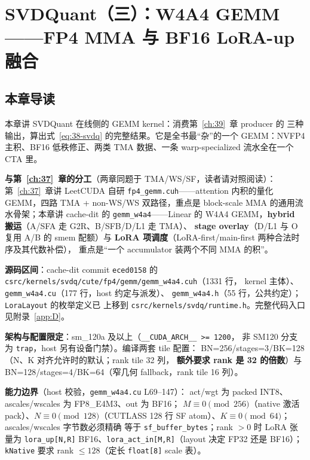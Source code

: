 \chapter{SVDQuant（三）：W4A4 GEMM——FP4 MMA 与 BF16 LoRA-up 融合}\label{ch:40}

\section{本章导读}

本章讲 SVDQuant 在线侧的 GEMM kernel：消费第~\ref{ch:39}~章 producer 的
三种输出，算出式~\ref{eq:38-svdq} 的完整结果。它是全书最“杂”的一个
GEMM：NVFP4 主积、BF16 低秩修正、两类 TMA 数据、一条 warp-specialized
流水全在一个 CTA 里。

\textbf{与第~\ref{ch:37}~章的分工}（两章同题于 TMA/WS/SF，读者请对照阅读）：
第~\ref{ch:37}~章讲 LeetCUDA 自研 \texttt{fp4\_gemm.cuh}——attention
内积的量化 GEMM，四路 TMA + non-WS/WS 双路径，重点是 block-scale MMA
的通用流水骨架；本章讲 cache-dit 的 \texttt{gemm\_w4a4}——Linear 的
W4A4 GEMM，\textbf{hybrid 搬运}（A/SFA 走 G2R、B/SFB/D/L1 走 TMA）、
\textbf{stage overlay}（D/L1 与 O 复用 A/B 的 smem 配额）与
\textbf{LoRA 项调度}（LoRA-first/main-first 两种合法时序及其代数补偿），
重点是“一个 accumulator 装两个不同 MMA 的积”。

\textbf{源码区间}：cache-dit commit \texttt{eced0158} 的
\texttt{csrc/kernels/svdq/cute/fp4/gemm/}\texttt{gemm\_w4a4.cuh}（1331 行，
kernel 主体）、\texttt{gemm\_w4a4.cu}（177 行，host 约定与派发）、
\texttt{gemm\_w4a4.h}（55 行，公共约定）；\texttt{LoraLayout} 的枚举定义已
上移到 \texttt{csrc/kernels/svdq/runtime.h}。完整代码入口见附录~\ref{app:D}。

\textbf{架构与配置限定}：sm\_120a 及以上（\texttt{\_\_CUDA\_ARCH\_\_ >= 1200}，
非 SM120 分支为 \texttt{trap}，host 另有设备门禁）。编译两套 tile 配置：
BN=256/stages=3/BK=128（N、K 对齐允许时的默认；rank tile 32 列，
\textbf{额外要求 rank 是 32 的倍数}）与 BN=128/stages=4/BK=64（窄几何
fallback，rank tile 16 列）。

\textbf{能力边界}（host 校验，\texttt{gemm\_w4a4.cu} L69--147）：
act/wgt 为 packed INT8、ascales/wscales 为 FP8\_E4M3、out 为 BF16；
$M\equiv0\pmod{256}$（native 激活 pack）、$N\equiv0\pmod{128}$（CUTLASS
128 行 SF atom）、$K\equiv0\pmod{64}$；ascales/wscales 字节数必须精确
等于 \texttt{sf\_buffer\_bytes}；rank $>0$ 时 LoRA 张量为
\texttt{lora\_up[N,R]} BF16、\texttt{lora\_act\_in[M,R]}（layout 决定
FP32 还是 BF16）；\texttt{kNative} 要求 rank $\le128$（定长
\texttt{float[8]} scale 表）。

